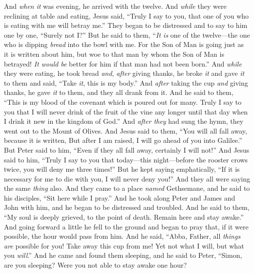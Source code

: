 \begin{biblechapter}
\verse And \textit{when it} was evening, he arrived with the twelve.
\verse And \textit{while} they were reclining at table and eating, Jesus said, “Truly I say to you, that one of you who is eating with me will betray me.”
\verse They began to be distressed and to say to him one by one, “Surely not I?”
\verse But he said to them, “\textit{It is} one of the twelve—the one who is dipping \textit{bread} into the bowl with me.
\verse For the Son of Man is going just as it is written about him, but woe to that man by whom the Son of Man is betrayed! \textit{It would be} better for him if that man had not been born.”
 And \textit{while} they were eating, he took bread \textit{and}, \textit{after} giving thanks, he broke \textit{it} and gave \textit{it} to them and said, “Take \textit{it}, this is my body.”
\verse And \textit{after} taking the cup \textit{and} giving thanks, he gave \textit{it} to them, and they all drank from it.
\verse And he said to them, “This is my blood of the covenant which is poured out for many.
\verse Truly I say to you that I will never drink of the fruit of the vine any longer until that day when I drink it new in the kingdom of God.”
\verse And \textit{after they} had sung the hymn, they went out to the Mount of Olives.
 And Jesus said to them, “You will all fall away, because it is written,
\verse But after I am raised, I will go ahead of you into Galilee.”
\verse But Peter said to him, “Even if they all fall away, certainly I will not!”
\verse And Jesus said to him, “Truly I say to you that today—this night—before the rooster crows twice, you will deny me three times!”
\verse But he kept saying emphatically, “If it is necessary for me to die with you, I will never deny you!” And they all were saying the same \textit{thing} also.
 And they came to a place \textit{named} Gethsemane, and he said to his disciples, “Sit here while I pray.”
\verse And he took along Peter and James and John with him, and he began to be distressed and troubled.
\verse And he said to them, “My soul is deeply grieved, to the point of death. Remain here and stay awake.”
\verse And going forward a little he fell to the ground and began to pray that, if it were possible, the hour would pass from him.
\verse And he said, “Abba, Father, all \textit{things} \textit{are} possible for you! Take away this cup from me! Yet not what I will, but what you \textit{will}.”
\verse And he came and found them sleeping, and he said to Peter, “Simon, are you sleeping? Were you not able to stay awake one hour?

\end{biblechapter}
